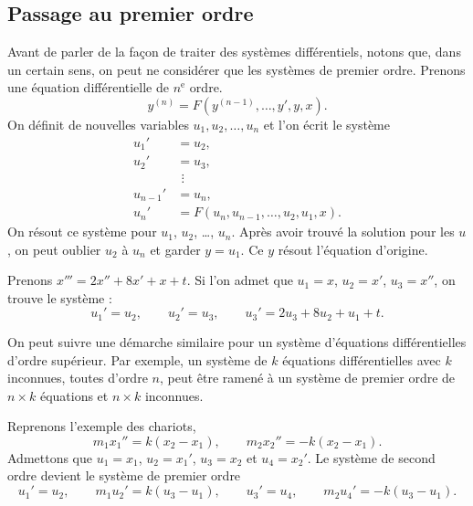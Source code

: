 \subsection{Passage au premier ordre}

Avant de parler de la façon de traiter des systèmes différentiels, notons que, dans un certain sens, on peut ne considérer que les systèmes de premier ordre. Prenons une équation différentielle de $n^{\text{e}}$ ordre.
\begin{equation*}
y^{(n)} = F(y^{(n-1)},\ldots,y',y,x) .
\end{equation*}
On définit de nouvelles variables $u_1, u_2, \ldots, u_n$ et l'on écrit le système
\begin{align*}
u_1' & = u_2 , \\
u_2' & = u_3 , \\
& ~\, \vdots \\
u_{n-1}' & = u_n , \\
u_n' & = F(u_n,u_{n-1},\ldots,u_2,u_1,x) .
\end{align*}
On résout ce système pour $u_1$, $u_2$, \ldots, $u_n$.  Après avoir trouvé la solution pour les $u$,
on peut oublier $u_2$ à $u_n$ et garder $y = u_1$.
Ce $y$ résout l'équation d'origine.

\begin{example}
Prenons $x''' = 2x''+ 8x' + x + t$.  Si l'on admet que $u_1 = x$, $u_2 = x'$, $u_3
= x''$, on trouve le système :
\begin{equation*}
u_1' = u_2, \qquad u_2' = u_3, \qquad u_3' = 2u_3 + 8u_2 + u_1 + t .
\end{equation*}
\end{example}

On peut suivre une démarche similaire pour un système d'équations différentielles d'ordre supérieur. Par exemple, un système de $k$ équations différentielles avec $k$
inconnues, toutes d’ordre $n$, peut être ramené à un système de premier ordre de 
$n \times k$
équations et $n \times k$ inconnues.

\begin{example}
Reprenons l’exemple des chariots,
\begin{equation*}
m_1 x_1''  = k(x_2-x_1), \qquad m_2 x_2'' = - k(x_2-x_1) .
\end{equation*}
Admettons que $u_1 = x_1$, $u_2 = x_1'$, 
$u_3 = x_2$ et $u_4 = x_2'$. Le système de second ordre devient le système de premier ordre
\begin{equation*}
u_1' = u_2, \qquad
m_1 u_2'  = k(u_3-u_1), \qquad
u_3' = u_4, \qquad
m_2 u_4' = - k(u_3-u_1) .
\end{equation*}
\end{example}

